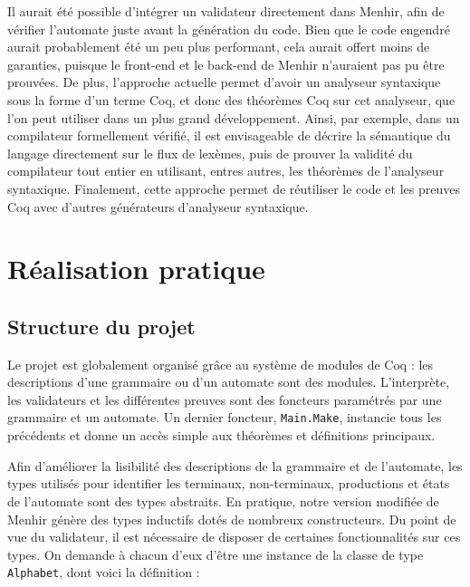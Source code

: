 \documentclass[a4paper,11pt]{article}
\begin{document}
Il aurait été possible d'intégrer un validateur directement dans Menhir,
afin de vérifier l'automate juste avant la génération du code. Bien
que le code engendré aurait probablement été un peu plus performant,
cela aurait offert moins de garanties, puisque le front-end et le
back-end de Menhir n'auraient pas pu être prouvées. De plus,
l'approche actuelle permet d'avoir un analyseur syntaxique sous la
forme d'un terme Coq, et donc des théorèmes Coq sur cet analyseur, que
l'on peut utiliser dans un plus grand développement. Ainsi, par
exemple, dans un compilateur formellement vérifié, il est envisageable
de décrire la sémantique du langage directement sur le flux de
lexèmes, puis de prouver la validité du compilateur tout entier en
utilisant, entres autres, les théorèmes de l'analyseur
syntaxique. Finalement, cette approche permet de réutiliser le code et
les preuves Coq avec d'autres générateurs d'analyseur syntaxique.

\section{Réalisation pratique}

\subsection{Structure du projet}

Le projet est globalement organisé grâce au système de modules de Coq
: les descriptions d'une grammaire ou d'un automate sont des
modules. L'interprète, les validateurs et les différentes preuves sont
des foncteurs paramétrés par une grammaire et un automate. Un dernier
foncteur, \verb+Main.Make+, instancie tous les précédents et donne un
accès simple aux théorèmes et définitions principaux.

Afin d'améliorer la lisibilité des descriptions de la grammaire et de
l'automate, les types utilisés pour identifier les terminaux,
non-terminaux, productions et états de l'automate sont des types
abstraits. En pratique, notre version modifiée de Menhir génère des
types inductifs dotés de nombreux constructeurs. Du point de vue du
validateur, il est nécessaire de disposer de certaines fonctionnalités
sur ces types. On demande à chacun d'eux d'être une instance de la
classe de type \verb+Alphabet+, dont voici la définition :
\end{document}
